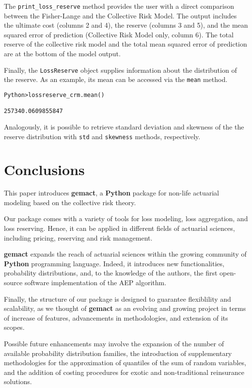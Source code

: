 \documentclass{article}
\begin{document}
The \texttt{print\_loss\_reserve} method provides the user with a direct comparison between the Fisher-Lange and the Collective Risk Model. The output includes the ultimate cost (columns 2 and 4), the reserve (columns 3 and 5), and the mean squared error of prediction (Collective Risk Model only, column 6).
The total reserve of the collective risk model and the total mean squared error of prediction are at the bottom of the model output.
\newline

Finally, the \texttt{LossReserve} object supplies information about the distribution of the reserve. As an example, its mean can be accessed via the \texttt{mean} method.

\begin{lstlisting}
Python>lossreserve_crm.mean()

257340.0609855847
\end{lstlisting}

Analogously, it is possible to retrieve standard deviation and skewness of the the reserve distribution with \texttt{std} and \texttt{skewness} methods, respectively.


\section{Conclusions}

This paper introduces \textbf{gemact}, a \textbf{Python} package for non-life actuarial modeling based on the collective risk theory.

Our package comes with a variety of tools for loss modeling, loss aggregation, and loss reserving. Hence, it can be applied in different fields of actuarial sciences, including pricing, reserving and risk management.

\textbf{gemact} expands the reach of actuarial sciences within the growing community of \textbf{Python} programming language. Indeed, it introduces new functionalities, probability distributions, and, to the knowledge of the authors, the first open-source software implementation of the AEP algorithm.

Finally, the structure of our package is designed to guarantee flexiblility and scalability, as we thought of \textbf{gemact} as an evolving and growing project in terms of increase of features, advancements in methodologies, and extension of its scopes.

Possible future enhancements may involve the expansion of the number of available probability distribution families, the introduction of supplementary methodologies for the approximation of quantiles of the sum of random variables, and the addition of costing procedures for exotic and non-traditional reinsurance solutions.
\end{document}
